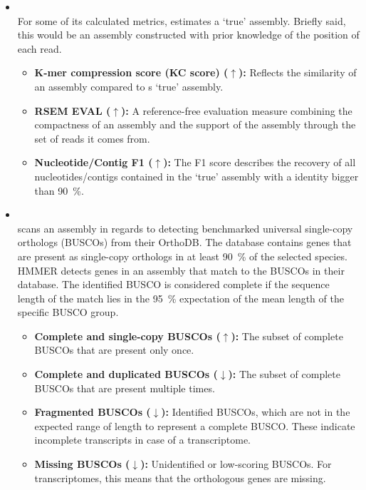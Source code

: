 \documentclass[12pt,a4paper,english]{article}
\begin{document}
\begin{itemize}
			\item \textbf{\detonate} \citep{DETONATE:14}\\
				For some of its calculated metrics, \detonate estimates a `true' assembly. Briefly said, this would be an assembly constructed with prior knowledge of the position of each read.
				\begin{itemize}
					\item \textbf{K-mer compression score (KC score) ($\uparrow$):} 
					Reflects the similarity of an assembly compared to \detonate{}s `true' assembly.					
					\item \textbf{RSEM EVAL ($\uparrow$):} A reference-free evaluation measure combining the compactness of an assembly and the support of the assembly through the set of reads it comes from.
					\item \textbf{Nucleotide/Contig F1 ($\uparrow$):} The F1 score describes the recovery of all nucleotides/contigs contained in the `true' assembly with a identity bigger than 90~\%.
				\end{itemize}

			\item \textbf{\busco} \citep{busco:15, busco:18}\\
			\busco scans an assembly in regards to detecting benchmarked universal single-copy orthologs (BUSCOs) from their OrthoDB. The database contains genes that are present as single-copy orthologs in at least 90~\% of the selected species.
			HMMER \citep{hmmer:11} detects genes in an assembly that match to the BUSCOs in their database. The identified BUSCO is considered complete if the sequence length of the match lies in the 95~\% expectation of the mean length of the specific BUSCO group.
				\begin{itemize}
					\item \textbf{Complete and single-copy BUSCOs ($\uparrow$):}
						The subset of complete BUSCOs that are present only once.
					\item \textbf{Complete and duplicated BUSCOs ($\downarrow$):}
						The subset of complete BUSCOs that are present multiple times.
					\item \textbf{Fragmented BUSCOs ($\downarrow$):}
						Identified BUSCOs, which are not in the expected range of length to represent a complete BUSCO. These indicate incomplete transcripts in case of a transcriptome.
					\item \textbf{Missing BUSCOs ($\downarrow$):}
						Unidentified or low-scoring BUSCOs.	For transcriptomes, this means that the orthologous genes are missing.
				\end{itemize}


\end{itemize}
\end{document}
